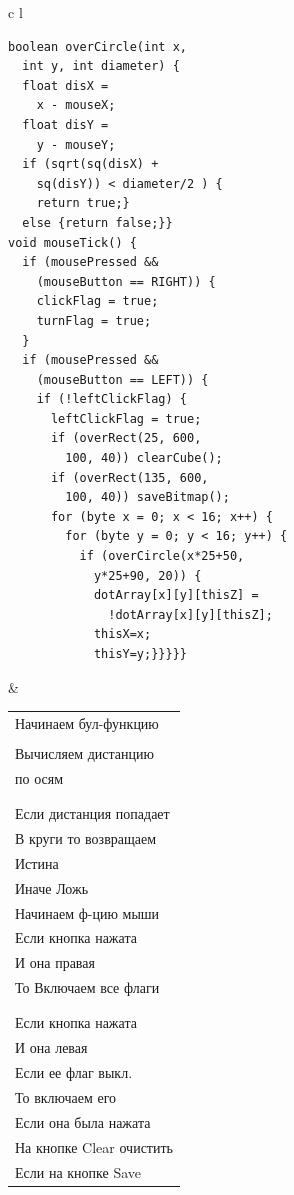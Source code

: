 \documentclass[a4paper, 12pt]{article}
\begin{document}
\begin{tabular}{c l}
  \hline
  \begin{lstlisting}[style=pmyLatexStyle]
boolean overCircle(int x, 
  int y, int diameter) {
  float disX = 
    x - mouseX;
  float disY = 
    y - mouseY;
  if (sqrt(sq(disX) + 
    sq(disY)) < diameter/2 ) {
    return true;} 
  else {return false;}}
void mouseTick() {
  if (mousePressed && 
    (mouseButton == RIGHT)) {
    clickFlag = true;
    turnFlag = true;
  }
  if (mousePressed && 
    (mouseButton == LEFT)) {
    if (!leftClickFlag) {
      leftClickFlag = true;
      if (overRect(25, 600,
        100, 40)) clearCube();
      if (overRect(135, 600,
        100, 40)) saveBitmap();
      for (byte x = 0; x < 16; x++) {
        for (byte y = 0; y < 16; y++) {
          if (overCircle(x*25+50,
            y*25+90, 20)) {
            dotArray[x][y][thisZ] = 
              !dotArray[x][y][thisZ];
            thisX=x;
            thisY=y;}}}}}
\end{lstlisting}
   &
  \begin{tabular}{l}
    Начинаем бул-функцию     \\
    \\
    Вычисляем дистанцию      \\
    по осям                  \\
    \\
    \\
    Если дистанция попадает  \\
    В круги то возвращаем    \\
    Истина                   \\
    Иначе Ложь               \\
    Начинаем ф-цию мыши      \\
    Если кнопка нажата       \\
    И она правая             \\
    То Включаем все флаги    \\
    \\
    \\
    Если кнопка нажата       \\
    И она левая              \\
    Если ее флаг выкл.       \\
    То включаем его          \\
    Если она была нажата     \\
    На кнопке Clear очистить \\
    Если на кнопке Save      \\

\end{tabular}
\end{tabular}
\end{document}
